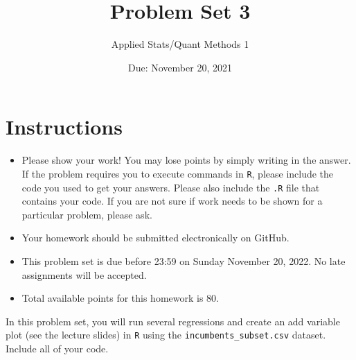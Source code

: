 \documentclass[12pt,letterpaper]{article}
\title{Problem Set 3}
\date{Due: November 20, 2021}
\author{Applied Stats/Quant Methods 1}
\begin{document}
	\maketitle
	\section*{Instructions}
	\begin{itemize}
		\item Please show your work! You may lose points by simply writing in the answer. If the problem requires you to execute commands in \texttt{R}, please include the code you used to get your answers. Please also include the \texttt{.R} file that contains your code. If you are not sure if work needs to be shown for a particular problem, please ask.
	\item Your homework should be submitted electronically on GitHub.
	\item This problem set is due before 23:59 on Sunday November 20, 2022. No late assignments will be accepted.
	\item Total available points for this homework is 80.
	\end{itemize}

		\vspace{.25cm}
	
\noindent In this problem set, you will run several regressions and create an add variable plot (see the lecture slides) in \texttt{R} using the \texttt{incumbents\_subset.csv} dataset. Include all of your code.

	\vspace{.5cm}
\end{document}
